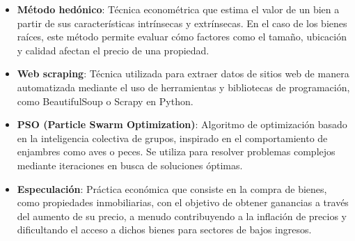 

\begin{itemize}
    \item \textbf{Método hedónico}: Técnica econométrica que estima el valor de un bien a partir de sus características intrínsecas y extrínsecas. En el caso de los bienes raíces, este método permite evaluar cómo factores como el tamaño, ubicación y calidad afectan el precio de una propiedad.

    \item \textbf{Web scraping}: Técnica utilizada para extraer datos de sitios web de manera automatizada mediante el uso de herramientas y bibliotecas de programación, como BeautifulSoup o Scrapy en Python.

    \item \textbf{PSO (Particle Swarm Optimization)}: Algoritmo de optimización basado en la inteligencia colectiva de grupos, inspirado en el comportamiento de enjambres como aves o peces. Se utiliza para resolver problemas complejos mediante iteraciones en busca de soluciones óptimas.

    \item \textbf{Especulación}: Práctica económica que consiste en la compra de bienes, como propiedades inmobiliarias, con el objetivo de obtener ganancias a través del aumento de su precio, a menudo contribuyendo a la inflación de precios y dificultando el acceso a dichos bienes para sectores de bajos ingresos.
\end{itemize}